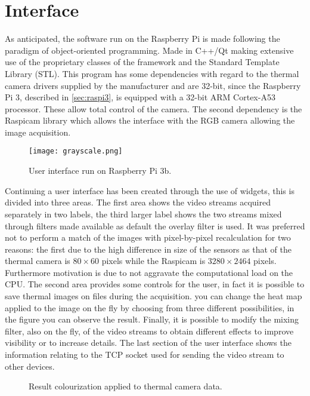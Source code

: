 %
\section{Interface}
\label{sec:raspberry-software}
As anticipated, the software run on the Raspberry Pi is made following the
paradigm of object-oriented programming. Made in C++/Qt making extensive use
of the proprietary classes of the framework and the Standard Template Library
(STL). This program has some dependencies with regard to the thermal camera
drivers supplied by the manufacturer and are 32-bit, since the Raspberry Pi 3,
described in \ref{sec:raspi3}, is equipped with a 32-bit ARM Cortex-A53
processor. These allow total control of the camera. The second dependency is the
Raspicam library which allows the interface with the RGB camera allowing the
image acquisition.
%
\begin{figure}[htb]
	\centering
	\texttt{[image: grayscale.png]}
	\caption{User interface run on Raspberry Pi 3b.}
	\label{fig:software-main-ui}
\end{figure}
%
Continuing a user interface has been created through the use of widgets, this is
divided into three areas. The first area shows the video streams acquired
separately in two labels, the third larger label shows the two streams mixed
through filters made available as default the overlay filter is used. It was
preferred not to perform a match of the images with pixel-by-pixel recalculation
for two reasons: the first due to the high difference in size of the sensors as
that of the thermal camera is $80 \times 60$ pixels while the Raspicam is $3280
\times 2464$ pixels. Furthermore motivation is due to not aggravate the 
computational load on the CPU.
The second area provides some controls for the user, in fact it is
possible to save thermal images on files during the acquisition. you can change
the heat map applied to the image on the fly by choosing from three different
possibilities, in the figure you can observe the result. 
Finally, it is possible to modify the mixing filter, also on the fly, of the
video streams to obtain different effects to improve visibility or to increase
details.
The last section of the user interface shows the information relating
to the TCP socket used for sending the video stream to other devices.
%
\begin{figure}[htb]
    \centering
     \quad
     \quad
    \caption{Result colourization applied to thermal camera data.}
    \label{fig:reuslt-maps}
\end{figure}
%
